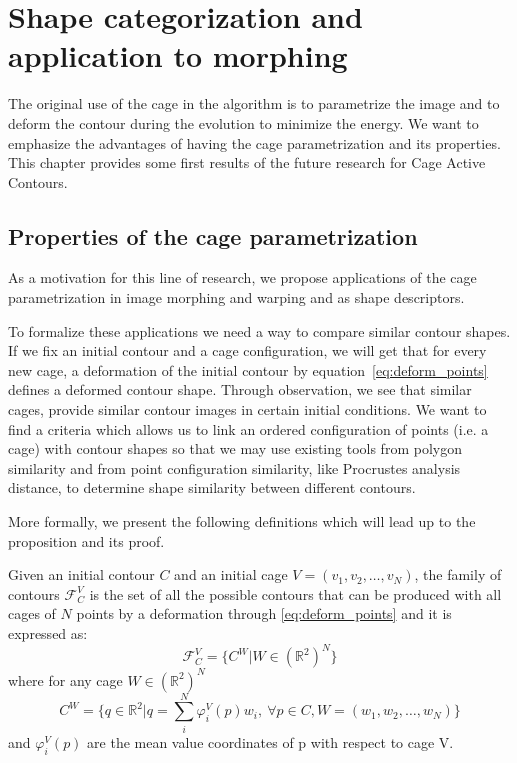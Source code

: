 \newpage

\chapter{ Shape categorization and application to morphing}
\label{sec:applications}

The original use of the cage in the algorithm is to parametrize the image and to deform the
contour during the evolution to minimize the energy. We want to emphasize the advantages of having the cage parametrization and its properties. This chapter provides some first results of the future research for Cage Active Contours.


\section{Properties of the cage parametrization}
\label{sec:properties_parametrization}

As a motivation for this line of research, we propose applications of the cage parametrization in image morphing and warping and as shape descriptors. 

To formalize these applications we need a way to compare similar contour shapes. If we fix an initial contour and a cage configuration, we will get that for every new cage, a deformation of the initial contour by equation~\eqref{eq:deform_points} defines a deformed contour shape. Through observation, we see that similar cages, provide similar contour images in certain initial conditions. We want to find a criteria which allows us to link an ordered configuration of points (i.e. a cage) with contour shapes so that we may use existing tools from polygon similarity\cite{Bykat:1979:PS}  and from point configuration similarity, like Procrustes analysis distance, to determine shape similarity between different contours.

More formally, we present the following definitions which will lead up to the proposition and its proof.

\begin{definition}\label{def:contour_family}
	Given an initial contour $C$ and an initial cage $V=(v_1,v_2,\dots,v_N)$, the family of contours $\mathcal{F}_C^V$ is the set of all the possible contours that can be produced with all cages of $N$ points by a deformation through \eqref{eq:deform_points} and it is expressed as:
	$$\mathcal{F}_C^V=\{ C^W\vert W \in (\mathbb{R}^2)^N \} $$
	where for any cage $W \in (\mathbb{R}^2)^N$ 
	$$C^W=\{q\in \mathbb{R}^2\vert q=\sum\limits_i^N\varphi_i^V(p)w_i ,\  \forall p \in C, W=(w_1, w_2, \dots, w_N)\}$$  
	and $\varphi_i^V(p)$ are the mean value coordinates of p with respect to cage V.
\end{definition}


